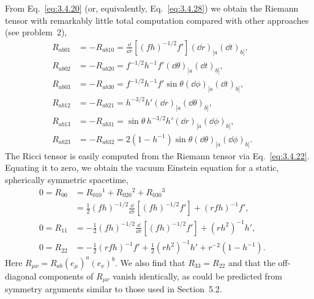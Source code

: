 From Eq.~\eqref{eq:3.4.20} (or, equivalently, Eq.~\eqref{eq:3.4.28}) we obtain
the Riemann tensor with remarkably little total computation compared with other
approaches (see problem~2),
\begin{align}
  R_{ab01}&=-R_{ab10}=\frac{\dd}{\dd r}\left[(fh)^{-1/2}f'\right]
     (\dd r)_{[a}(\dd t)_{b]},
  &&\tag{6.1.29}\label{eq:6.1.29}\\
  R_{ab02}&=-R_{ab20}=f^{-1/2}h^{-1}f'(\dd\theta)_{[a}(\dd t)_{b]},
  &&\tag{6.1.30}\label{eq:6.1.30}\\
  R_{ab03}&=-R_{ab30}=f^{-1/2}h^{-1}f'\sin\theta(\dd\phi)_{[a}(\dd t)_{b]},
  &&\tag{6.1.31}\label{eq:6.1.31}\\
  R_{ab12}&=-R_{ab21}=h^{-3/2}h'(\dd r)_{[a}(\dd\theta)_{b]},
  &&\tag{6.1.32}\label{eq:6.1.32}\\
  R_{ab13}&=-R_{ab31}=\sin\theta\,h^{-3/2}h'(\dd r)_{[a}(\dd\phi)_{b]},
  &&\tag{6.1.33}\label{eq:6.1.33}\\
  R_{ab23}&=-R_{ab32}=2(1-h^{-1})\sin\theta(\dd\theta)_{[a}(\dd\phi)_{b]}.
  &&\tag{6.1.34}\label{eq:6.1.34}
\end{align}
The Ricci tensor is easily computed from the Riemann tensor via
Eq.~\eqref{eq:3.4.22}. Equating it to zero, we obtain the vacuum Einstein
equation for a static, spherically symmetric spacetime,
\begin{align}
  0=R_{00}
    &=R_{010}{}^1+R_{020}{}^2+R_{030}{}^3 \nonumber\\
    &=\frac12(fh)^{-1/2}\frac{\dd}{\dd r}\left[(fh)^{-1/2}f'\right]
      +(rfh)^{-1}f',
  &&\tag{6.1.35}\label{eq:6.1.35}\\
  0=R_{11}
    &=-\frac12(fh)^{-1/2}\frac{\dd}{\dd r}\left[(fh)^{-1/2}f'\right]
      +(rh^2)^{-1}h',
  &&\tag{6.1.36}\label{eq:6.1.36}\\
  0=R_{22}
    &=-\frac12(rfh)^{-1}f'+\frac12(rh^2)^{-1}h'
      +r^{-2}(1-h^{-1}).
  &&\tag{6.1.37}\label{eq:6.1.37}
\end{align}
Here \(R_{\mu\nu}=R_{ab}(e_\mu)^a(e_\nu)^b\). We also find that
\(R_{33}=R_{22}\) and that the off-diagonal components of \(R_{\mu\nu}\) vanish
identically, as could be predicted from symmetry arguments similar to those used
in Section~5.2.

